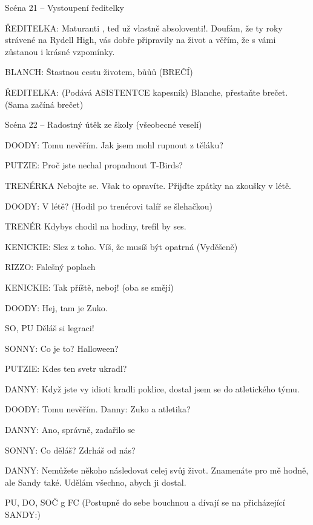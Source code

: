 Scéna 21  – Vystoupení ředitelky 

\rep ŘEDITELKA:        Maturanti , teď už vlastně absoloventi!.  Doufám, že ty roky strávené na         Rydell High, vás dobře připravily na život a věřím, že s vámi zůstanou i         krásné vzpomínky. 

\rep BLANCH:        Štastnou cestu životem, bůůů (BREČÍ)

\rep ŘEDITELKA:        (Podává ASISTENTCE kapesník) Blanche, přestaňte brečet. (Sama                 začíná brečet)





Scéna 22  – Radostný útěk ze školy (všeobecné veselí)

\rep DOODY:        Tomu nevěřím. Jak jsem mohl rupnout z těláku?

\rep PUTZIE:        Proč jste nechal propadnout T-Birds?

TRENÉRKA        Nebojte se. Však to opravíte. Přijďte zpátky na zkoušky v létě.

\rep DOODY:        V létě? (Hodil po trenérovi talíř se šlehačkou)

TRENÉR        Kdybys chodil na hodiny, trefil by ses.

\rep KENICKIE:        Slez z toho. Víš, že musíš být opatrná (Vyděšeně)

\rep RIZZO:        Falešný poplach

\rep KENICKIE:        Tak příště, neboj! (oba se smějí)

\rep DOODY:        Hej, tam je Zuko. 

SO, PU        Děláš si legraci!

\rep SONNY:        Co je to? Halloween?

\rep PUTZIE:        Kdes ten svetr ukradl?

\rep DANNY:        Když jste vy idioti kradli poklice, dostal jsem se do atletického týmu. 

\rep DOODY:        Tomu nevěřím. \rep Danny: Zuko a atletika?

\rep DANNY:        Ano, správně, zadařilo se

\rep SONNY:        Co děláš? Zdrháš od nás?

\rep DANNY:        Nemůžete někoho následovat celej svůj život. Znamenáte pro mě hodně, ale         Sandy také. Udělám všechno, abych ji dostal. 

PU, DO, SOČ g FC        (Postupně do sebe bouchnou a dívají se na přicházející SANDY\rep :) 

